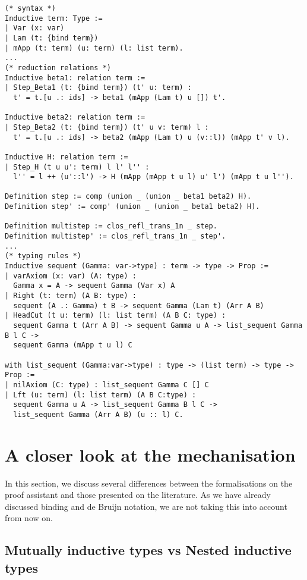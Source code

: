 \begin{lstlisting}[language=Coq]
(* syntax *)
Inductive term: Type :=
| Var (x: var)
| Lam (t: {bind term})
| mApp (t: term) (u: term) (l: list term).
...
(* reduction relations *)
Inductive beta1: relation term :=
| Step_Beta1 (t: {bind term}) (t' u: term) :
  t' = t.[u .: ids] -> beta1 (mApp (Lam t) u []) t'.

Inductive beta2: relation term :=
| Step_Beta2 (t: {bind term}) (t' u v: term) l :
  t' = t.[u .: ids] -> beta2 (mApp (Lam t) u (v::l)) (mApp t' v l).

Inductive H: relation term :=       
| Step_H (t u u': term) l l' l'' :
  l'' = l ++ (u'::l') -> H (mApp (mApp t u l) u' l') (mApp t u l'').

Definition step := comp (union _ (union _ beta1 beta2) H).
Definition step' := comp' (union _ (union _ beta1 beta2) H).

Definition multistep := clos_refl_trans_1n _ step.
Definition multistep' := clos_refl_trans_1n _ step'.
...
(* typing rules *)
Inductive sequent (Gamma: var->type) : term -> type -> Prop := 
| varAxiom (x: var) (A: type) :
  Gamma x = A -> sequent Gamma (Var x) A
| Right (t: term) (A B: type) :
  sequent (A .: Gamma) t B -> sequent Gamma (Lam t) (Arr A B)
| HeadCut (t u: term) (l: list term) (A B C: type) :
  sequent Gamma t (Arr A B) -> sequent Gamma u A -> list_sequent Gamma B l C ->
  sequent Gamma (mApp t u l) C

with list_sequent (Gamma:var->type) : type -> (list term) -> type -> Prop :=
| nilAxiom (C: type) : list_sequent Gamma C [] C
| Lft (u: term) (l: list term) (A B C:type) :
  sequent Gamma u A -> list_sequent Gamma B l C ->
  list_sequent Gamma (Arr A B) (u :: l) C.
\end{lstlisting}

\section{A closer look at the mechanisation}

In this section, we discuss several differences between the formalisations on the proof assistant and those presented on the literature.
As we have already discussed binding and de Bruijn notation, we are not taking this into account from now on.

\subsection{Mutually inductive types vs Nested inductive types}

